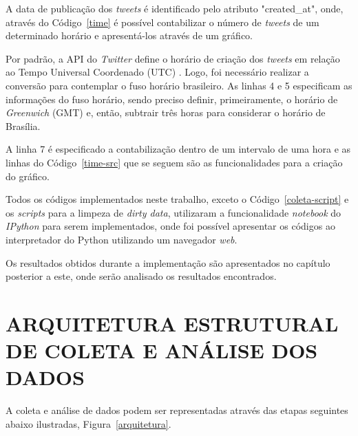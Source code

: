 

A data de publicação dos \textit{tweets} é identificado pelo atributo "created\_at", onde, através do Código~\ref{time} é possível contabilizar o número de \textit{tweets} de um determinado horário e apresentá-los através de um gráfico.

Por padrão, a API do \textit{Twitter} define o horário de criação dos \textit{tweets} em relação ao Tempo Universal Coordenado (UTC) \cite{twitter-doc}. Logo, foi necessário realizar a conversão para contemplar o fuso horário brasileiro. As linhas 4 e 5 especificam as informações do fuso horário, sendo preciso definir, primeiramente, o horário de \textit{Greenwich} (GMT) e, então, subtrair três horas para considerar o horário de Brasília.

A linha 7 é especificado a contabilização dentro de um intervalo de uma hora e as linhas do Código~\ref{time-src} que se seguem são as funcionalidades para a criação do gráfico.



Todos os códigos implementados neste trabalho, exceto o Código~\ref{coleta-script} e os \textit{scripts} para a limpeza de \textit{dirty data}, utilizaram a funcionalidade \textit{notebook} do \textit{IPython} para serem implementados, onde foi possível apresentar os códigos ao interpretador do Python utilizando um navegador \textit{web}.

Os resultados obtidos durante a implementação são apresentados no capítulo posterior a este, onde serão analisado os resultados encontrados.

\section{ARQUITETURA ESTRUTURAL DE COLETA E ANÁLISE DOS DADOS}
A coleta e análise de dados podem ser representadas através das etapas seguintes abaixo ilustradas, Figura~\ref{arquitetura}.

